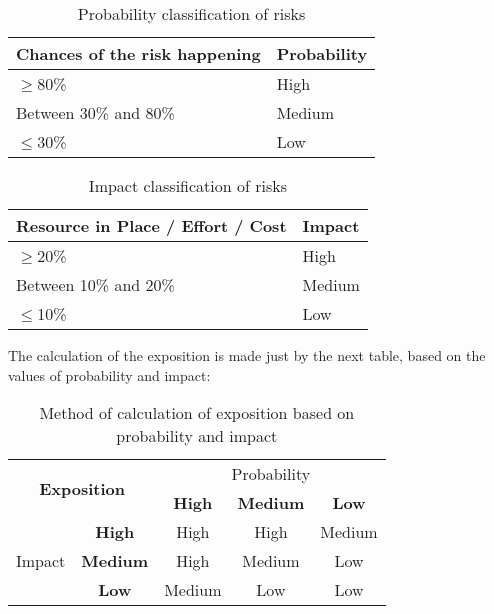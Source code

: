 \begin{table}[H]
	\centering
	\begin{tabular}{|l|l|}
		\hline
		\rowcolor{gray!30}
		Chances of the risk happening & Probability \\ \hline
		$\geq$80\% & \cellcolor{red!60}High\\ \hline
		Between 30\% and 80\% & \cellcolor{yellow!40}Medium\\ \hline
		$\leq$30\% & \cellcolor{green!60}Low\\ \hline
	\end{tabular}
	\caption{Probability classification of risks}
\end{table}

\begin{table}[H]
	\centering
	\begin{tabular}{|l|l|}
		\hline
		\rowcolor{gray!30}
		Resource in Place / Effort / Cost & Impact \\ \hline
		$\geq$20\% & \cellcolor{red!60}High\\ \hline
		Between 10\% and 20\% & \cellcolor{yellow!40}Medium\\ \hline
		$\leq$10\% & \cellcolor{green!60}Low\\ \hline
	\end{tabular}
	\caption{Impact classification of risks}
\end{table}

\linej
The calculation of the exposition is made just by the next table, based on the values of probability and impact:
\begin{table}[H]
	\centering
	\begin{tabular}{|c|c|c|c|c|}
	\hline
		\multicolumn{2}{|c|}{\multirow{2}{*}{\large\textbf{Exposition}}} & \multicolumn{3}{c|}{Probability}\\
		\multicolumn{2}{|c|}{} & \cellcolor{gray!15}\textbf{High} & \cellcolor{gray!15}\textbf{Medium} & \cellcolor{gray!15}\textbf{Low}\\ \hline %
		\multirow{3}{*}{Impact} & \cellcolor{gray!15}\textbf{High} & \cellcolor{red!60}High & \cellcolor{red!60}High & \cellcolor{yellow!40}Medium\\
		& \cellcolor{gray!15}\textbf{Medium} & \cellcolor{red!60}High & \cellcolor{yellow!40}Medium & \cellcolor{green!60}Low\\
		& \cellcolor{gray!15}\textbf{Low} & \cellcolor{yellow!40}Medium & \cellcolor{green!60}Low & \cellcolor{green!60}Low\\ \hline
	\end{tabular}
	\caption{Method of calculation of exposition based on probability and impact}
\end{table}

